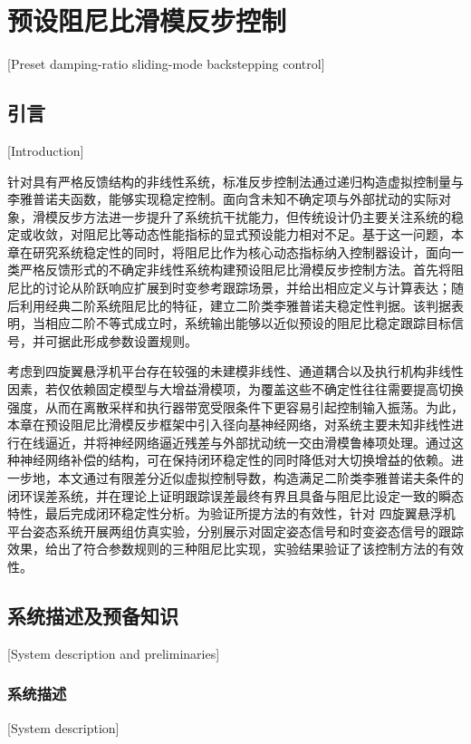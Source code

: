 
\chapter{预设阻尼比滑模反步控制}[Preset damping-ratio sliding-mode backstepping control]

\section{引言}[Introduction]

针对具有严格反馈结构的非线性系统，标准反步控制法通过递归构造虚拟控制量与李雅普诺夫函数，能够实现稳定控制。面向含未知不确定项与外部扰动的实际对象，滑模反步方法进一步提升了系统抗干扰能力，但传统设计仍主要关注系统的稳定或收敛，对阻尼比等动态性能指标的显式预设能力相对不足。基于这一问题，本章在研究系统稳定性的同时，将阻尼比作为核心动态指标纳入控制器设计，面向一类严格反馈形式的不确定非线性系统构建预设阻尼比滑模反步控制方法。首先将阻尼比的讨论从阶跃响应扩展到时变参考跟踪场景，并给出相应定义与计算表达；随后利用经典二阶系统阻尼比的特征，建立二阶类李雅普诺夫稳定性判据。该判据表明，当相应二阶不等式成立时，系统输出能够以近似预设的阻尼比稳定跟踪目标信号，并可据此形成参数设置规则。

考虑到四旋翼悬浮机平台存在较强的未建模非线性、通道耦合以及执行机构非线性因素，若仅依赖固定模型与大增益滑模项，为覆盖这些不确定性往往需要提高切换强度，从而在离散采样和执行器带宽受限条件下更容易引起控制输入振荡。为此，本章在预设阻尼比滑模反步框架中引入径向基神经网络，对系统主要未知非线性进行在线逼近，并将神经网络逼近残差与外部扰动统一交由滑模鲁棒项处理。通过这种神经网络补偿的结构，可在保持闭环稳定性的同时降低对大切换增益的依赖。进一步地，本文通过有限差分近似虚拟控制导数，构造满足二阶类李雅普诺夫条件的闭环误差系统，并在理论上证明跟踪误差最终有界且具备与阻尼比设定一致的瞬态特性，最后完成闭环稳定性分析。为验证所提方法的有效性，针对 四旋翼悬浮机平台姿态系统开展两组仿真实验，分别展示对固定姿态信号和时变姿态信号的跟踪效果，给出了符合参数规则的三种阻尼比实现，实验结果验证了该控制方法的有效性。

\section{系统描述及预备知识}[System description and preliminaries]


\subsection{系统描述}[System description]

